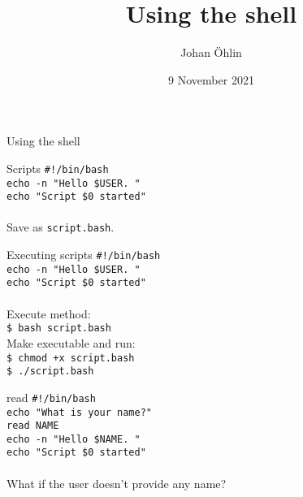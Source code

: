 \documentclass{beamer}
\title{Using the shell}
\date{9 November 2021}
\author{Johan Öhlin}
\institute{Yabs}
\let\tt\texttt
\begin{document}
\begin{frame}{Using the shell}
\maketitle
\end{frame}

\begin{frame}{Scripts}
        \tt{\#!/bin/bash}               \\
        \tt{echo -n "Hello \$USER. "}   \\
        \tt{echo "Script \$0 started"}  \\
        \quad                           \\
        Save as \tt{script.bash}.
\end{frame}

\begin{frame}{Executing scripts}
        \tt{\#!/bin/bash}               \\
        \tt{echo -n "Hello \$USER. "}   \\
        \tt{echo "Script \$0 started"}  \\
        \quad                           \\
        Execute method:                 \\
        \quad \tt{\$ bash script.bash}      \\
        Make executable and run:            \\
        \quad \tt{\$ chmod +x script.bash}  \\
        \quad \tt{\$ ./script.bash}         \\
\end{frame}

\begin{frame}{read}
        \tt{\#!/bin/bash}                   \\
        \tt{echo "What is your name?"}      \\
        \tt{read NAME}                      \\
        \tt{echo -n "Hello \$NAME. "}       \\
        \tt{echo "Script \$0 started"}      \\
        \quad \\
        What if the user doesn't provide any name?
\end{frame}
\end{document}
